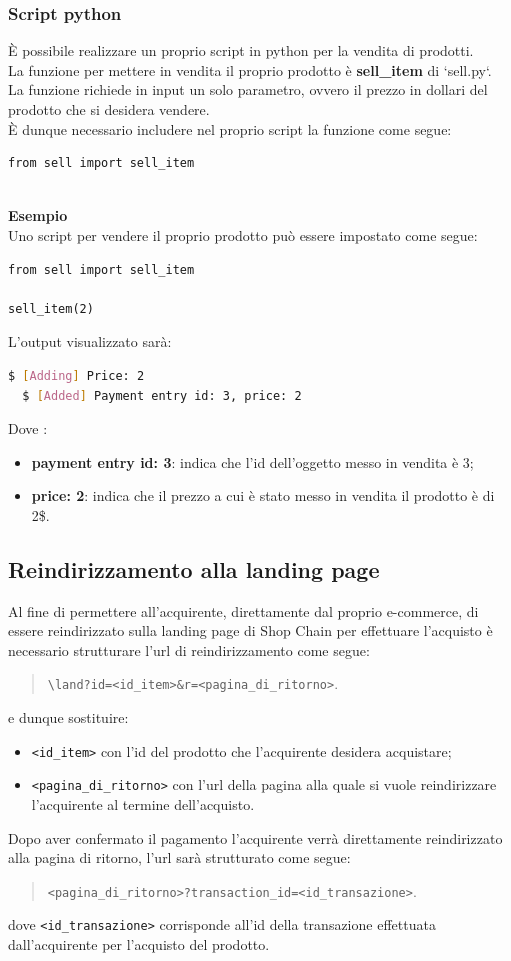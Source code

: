 \documentclass[a4paper, 12pt]{article}
\begin{document}
\subsubsection{Script python}
È possibile realizzare un proprio script in python per la vendita di prodotti.\\
La funzione per mettere in vendita il proprio prodotto è \textbf{sell\_item} di `sell.py`. La funzione richiede in input un solo parametro, ovvero il prezzo in dollari del prodotto che si desidera vendere.\\
È dunque necessario includere nel proprio script la funzione come segue:
\begin{verbatim}
from sell import sell_item
\end{verbatim}
\mbox{}\\
\textbf{Esempio}
\\
Uno script per vendere il proprio prodotto può essere impostato come segue:
\begin{verbatim}
from sell import sell_item

sell_item(2)
\end{verbatim}
L'output visualizzato sarà:
\begin{lstlisting}[language=bash]
  $ [Adding] Price: 2
  $ [Added] Payment entry id: 3, price: 2
\end{lstlisting}
Dove :
\begin{itemize}
  \item \textbf{payment entry id: 3}: indica che l'id dell'oggetto messo in vendita è 3;
  \item \textbf{price: 2}: indica che il prezzo a cui è stato messo in vendita il prodotto è di 2\$.
\end{itemize}
\subsection{Reindirizzamento alla landing page}
Al fine di permettere all'acquirente, direttamente dal proprio e-commerce, di essere reindirizzato sulla landing page di Shop Chain per effettuare l'acquisto è necessario strutturare l'url di reindirizzamento come segue:
\begin{quote}
  \verb|\land?id=<id_item>&r=<pagina_di_ritorno>|.
\end{quote}
e dunque sostituire:
\begin{itemize}
  \item \verb|<id_item>| con l'id del prodotto che l'acquirente desidera acquistare;
  \item \verb|<pagina_di_ritorno>| con l'url della pagina alla quale si vuole reindirizzare l'acquirente al termine dell'acquisto.
\end{itemize}
Dopo aver confermato il pagamento l'acquirente verrà direttamente reindirizzato alla pagina di ritorno, l'url sarà strutturato come segue:
\begin{quote}
  \verb|<pagina_di_ritorno>?transaction_id=<id_transazione>|.
\end{quote}
dove \verb|<id_transazione>| corrisponde all'id della transazione effettuata dall'acquirente per l'acquisto del prodotto.
\end{document}
